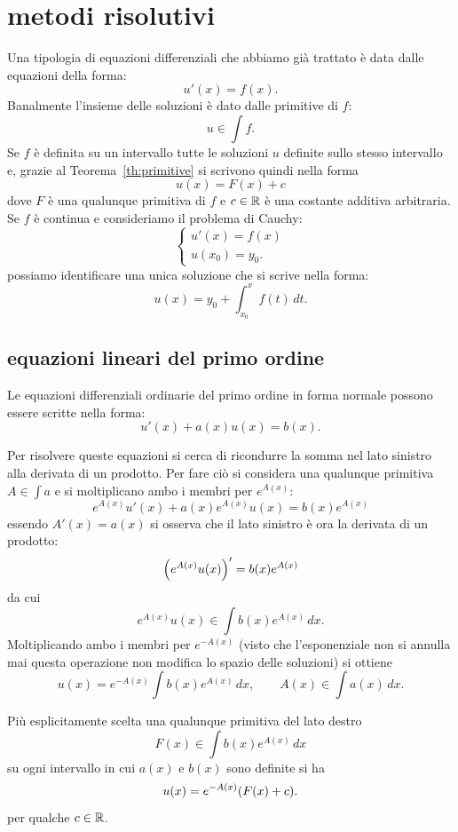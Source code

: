 \section{metodi risolutivi}

Una tipologia di equazioni differenziali che abbiamo già trattato
è data dalle equazioni della forma:
\[
   u'(x) = f(x).
\]
Banalmente l'insieme delle soluzioni è dato dalle primitive di $f$:
\[
  u \in \int f.
\]
Se $f$ è definita su un intervallo tutte le soluzioni $u$ definite sullo stesso
intervallo e, grazie al Teorema~\ref{th:primitive}
si scrivono quindi nella forma
\[
  u(x) = F(x) + c
\]
dove $F$ è una qualunque primitiva di $f$ e $c\in \mathbb R$ è una costante additiva
arbitraria.
Se $f$ è continua e consideriamo il problema di Cauchy:
\[
  \begin{cases}
    u'(x) = f(x) \\
    u(x_0) = y_0.
  \end{cases}
\]
possiamo identificare una unica soluzione
che si scrive nella forma:
\[
  u(x) = y_0 + \int_{x_0}^x f(t)\, dt.
\]

\subsection{equazioni lineari del primo ordine}

Le equazioni differenziali ordinarie del primo
ordine in forma normale possono essere scritte nella forma:
\mymark{***}
\begin{equation}\label{eq:47744}
   u'(x) + a(x) u(x) = b(x).
\end{equation}

Per risolvere queste equazioni si cerca di ricondurre la somma
nel lato sinistro alla derivata di un prodotto.
Per fare ciò si considera una qualunque primitiva
$A\in \int a$ e si moltiplicano ambo i membri
per $e^{A(x)}$:
\[
  e^{A(x)} u'(x) + a(x) e^{A(x)} u(x) = b(x) e^{A(x)}
\]
essendo $A'(x) = a(x)$
si osserva che il lato sinistro è ora la derivata di un prodotto:
\[
  {\left( e^{A(x)}u(x) \right)}' = b(x) e^{A(x)}
\]
da cui
\[
  e^{A(x)} u(x) \in \int b(x) e^{A(x)}\, dx.
\]
Moltiplicando ambo i membri per $e^{-A(x)}$ (visto che l'esponenziale
non si annulla mai questa operazione non modifica lo spazio delle soluzioni)
si ottiene
\[
u(x) = e^{-A(x)} \int b(x) e^{A(x)}\, dx, \qquad
A(x) \in \int a(x)\, dx.
\]

Più esplicitamente
scelta una qualunque primitiva del lato destro
\[
  F(x) \in \int b(x) e^{A(x)}\, dx
\]
su ogni intervallo in cui $a(x)$ e $b(x)$ sono definite
si ha
\[
  u(x) = e^{-A(x)}{\left( F(x) + c \right)}.
\]
per qualche $c\in \mathbb R$.

